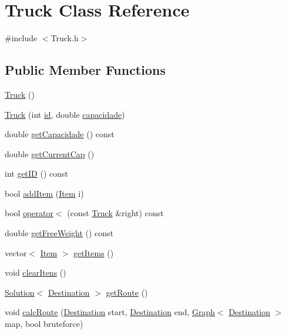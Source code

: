 \hypertarget{class_truck}{}\section{Truck Class Reference}
\label{class_truck}


{\ttfamily \#include $<$Truck.\+h$>$}

\subsection*{Public Member Functions}
\begin{DoxyCompactItemize}
\item 
\hyperlink{class_truck_a87e358bca8fe34e6299c6ff233afb08b}{Truck} ()
\item 
\hyperlink{class_truck_ac0858b8c59242c95eaa84626c930e4bf}{Truck} (int \hyperlink{class_truck_a598e606d5c16e5664e222ad13c02db77}{id}, double \hyperlink{class_truck_a6d90d9d2c20e89194204c2df9f979539}{capacidade})
\item 
double \hyperlink{class_truck_af808e9645d27673a022addab061d609c}{get\+Capacidade} () const 
\item 
double \hyperlink{class_truck_aec408294112b2cb579e86d252750a5ad}{get\+Current\+Cap} ()
\item 
int \hyperlink{class_truck_a583716d027c07c71f16f6ee1a9fbdc06}{get\+I\+D} () const 
\item 
bool \hyperlink{class_truck_aa730c597f013c6676d4014d68e989379}{add\+Item} (\hyperlink{class_item}{Item} i)
\item 
bool \hyperlink{class_truck_aec7e2c7369d987f120c327b24b02a61e}{operator$<$} (const \hyperlink{class_truck}{Truck} \&right) const 
\item 
double \hyperlink{class_truck_a926e53d7dc3a8078b9f5f0c4c8220e4b}{get\+Free\+Weight} () const 
\item 
vector$<$ \hyperlink{class_item}{Item} $>$ \hyperlink{class_truck_a136f9d628ee239bcce13121fe93598b7}{get\+Items} ()
\item 
void \hyperlink{class_truck_a9a97d0e2b747669e7f29729c598d559e}{clear\+Itens} ()
\item 
\hyperlink{struct_solution}{Solution}$<$ \hyperlink{class_destination}{Destination} $>$ \hyperlink{class_truck_aeb1b84bd2813e1ff66156e3668316d10}{get\+Route} ()
\item 
void \hyperlink{class_truck_a1210291d159fe120cd5540825a4afbf7}{calc\+Route} (\hyperlink{class_destination}{Destination} start, \hyperlink{class_destination}{Destination} end, \hyperlink{class_graph}{Graph}$<$ \hyperlink{class_destination}{Destination} $>$ map, bool bruteforce)
\end{DoxyCompactItemize}
